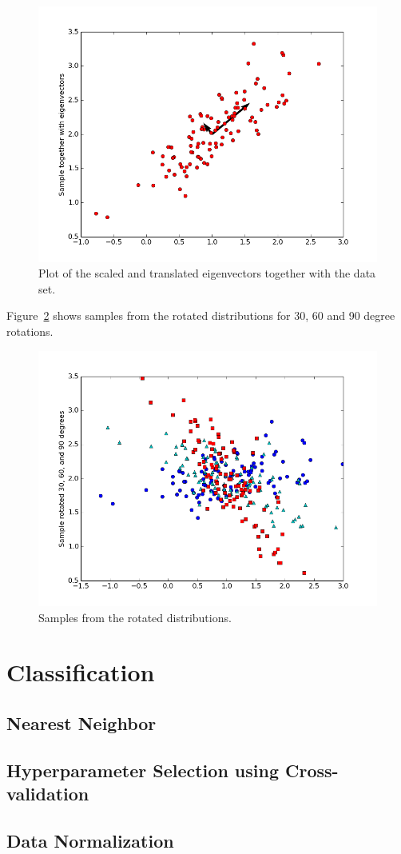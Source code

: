 \documentclass[a4paper]{article}
\begin{document}
\begin{figure}[ht]
  \centering
  \includegraphics[width=.8\linewidth]{figures/samples_with_eigenvectors.png}
  \caption{Plot of the scaled and translated eigenvectors together with the data set.}
  \label{fig:samples_with_eigenvectors}
\end{figure}

Figure~\ref{fig:samples_rotated} shows samples from the rotated distributions for 30, 60 and 90 degree rotations.

\begin{figure}[ht]
  \centering
  \includegraphics[width=.8\linewidth]{figures/samples_rotated.png}
  \caption{Samples from the rotated distributions.}
  \label{fig:samples_rotated}
\end{figure}

\section{Classification}

\subsection{Nearest Neighbor}

\subsection{Hyperparameter Selection using Cross-validation}

\subsection{Data Normalization}
\end{document}
